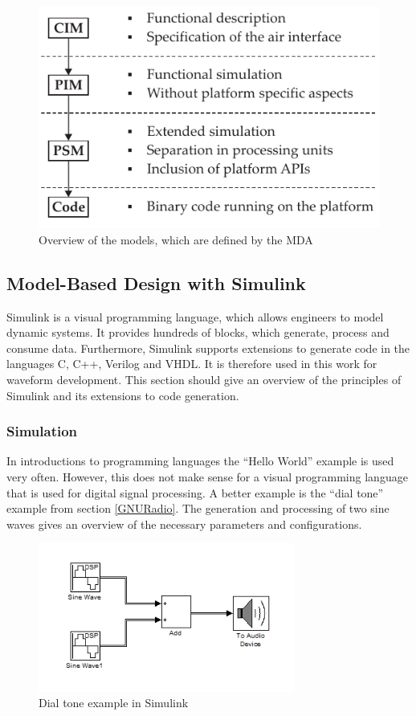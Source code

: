 \begin{figure}
	\centering
		\includegraphics[]{../kapitel02/figures/mda_structure.pdf}
	\caption{Overview of the models, which are defined by the MDA}
	\label{fig:mda_structure}
\end{figure}



\subsection{Model-Based Design with Simulink}
Simulink \cite{simu_ug} is a visual programming language, which allows engineers to model dynamic systems. It provides hundreds of blocks, which generate, process and consume data. Furthermore, Simulink supports extensions to generate code in the languages C, C++, Verilog and VHDL. It is therefore used in this work for waveform development. This section should give an overview of the principles of Simulink and its extensions to code generation.

\subsubsection{Simulation}
In introductions to programming languages the ``Hello World'' example is used very often. However, this does not make sense for a visual programming language that is used for digital signal processing. A better example is the ``dial tone'' example from section \ref{GNURadio}. The generation and processing of two sine waves gives an overview of the necessary parameters and configurations.


\begin{figure}
	\centering
		\includegraphics[width=0.75\textwidth]{../kapitel02/figures/dial_tone_simu.PNG}
		\caption{Dial tone example in Simulink}
	\label{fig:dial_tone_simu}
\end{figure}

